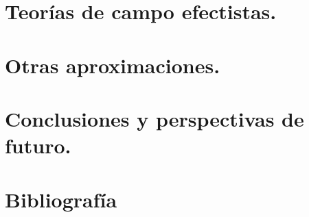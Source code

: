 \documentclass[a4paper,titlepage]{article}
\begin{document}
%
\section{Teorías de campo efectistas.} %
%
\section{Otras aproximaciones.} %
%
\section{Conclusiones y perspectivas de futuro.} %

%
\section{Bibliografía}


\nocite{*}
\end{document}
